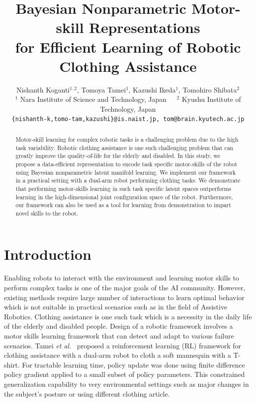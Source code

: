\documentclass{article}
\title{Bayesian Nonparametric Motor-skill Representations \\ for Efficient Learning of Robotic Clothing Assistance}
\author{
  Nishanth Koganti$^{1,2}$, Tomoya Tamei$^{1}$, Kazushi Ikeda$^{1}$, Tomohiro Shibata$^{2}$\\
  $^1$ Nara Institute of Science and Technology, Japan~~~$^2$ Kyushu Institute of Technology, Japan\\
  \texttt{\{nishanth-k,tomo-tam,kazushi\}@is.naist.jp, tom@brain.kyutech.ac.jp} \\
}
\begin{document}
\maketitle

\begin{abstract}
Motor-skill learning for complex robotic tasks is a challenging problem due to the high task variability. Robotic clothing assistance is one such challenging problem that can greatly improve the quality-of-life for the elderly and disabled. In this study, we propose a data-efficient representation to encode task specific motor-skills of the robot using Bayesian nonparametric latent manifold learning. We implement our framework in a practical setting with a dual-arm robot performing clothing tasks. We demonstrate that performing motor-skills learning in such task specific latent spaces outperforms learning in the high-dimensional joint configuration space of the robot. Furthermore, our framework can also be used as a tool for learning from demonstration to impart novel skills to the robot.
\end{abstract}

\section{Introduction}
\label{section:introduction}

Enabling robots to interact with the environment and learning motor skills to perform complex tasks is one of the major goals of the AI community. However, existing methods require large number of interactions to learn optimal behavior which is not suitable in practical scenarios such as in the field of Assistive Robotics. Clothing assistance is one such task which is a necessity in the daily life of the elderly and disabled people. Design of a robotic framework involves a motor skills learning framework that can detect and adapt to various failure scenarios. Tamei \emph{et al.}~\cite{tamei} proposed a reinforcement learning (RL) framework for clothing assistance with a dual-arm robot to cloth a soft mannequin with a T-shirt. For tractable learning time, policy update was done using finite difference policy gradient applied to a small subset of policy parameters. This constrained generalization capability to very environmental settings such as major changes in the subject's posture or using different clothing article.
\end{document}
